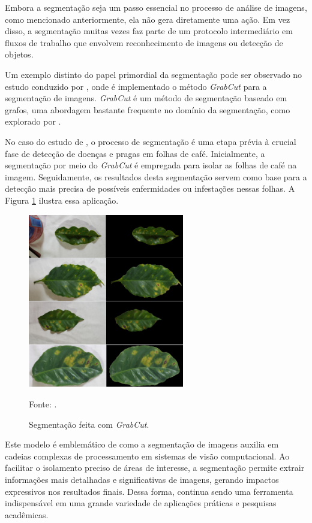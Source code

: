 Embora a segmentação seja um passo essencial no processo de análise de imagens, como mencionado anteriormente, ela não gera diretamente uma ação. Em vez disso, a segmentação muitas vezes faz parte de um protocolo intermediário em fluxos de trabalho que envolvem reconhecimento de imagens ou detecção de objetos.

Um exemplo distinto do papel primordial da segmentação pode ser observado no estudo conduzido por \cite{Carneiro2021}, onde é implementado o método \textit{GrabCut} \citep{rother2004grabcut} para a segmentação de imagens. \textit{GrabCut} é um método de segmentação baseado em grafos, uma abordagem bastante frequente no domínio da segmentação, como explorado por \cite{Yi2012}.

No caso do estudo de \cite{Carneiro2021}, o processo de segmentação é uma etapa prévia à crucial fase de detecção de doenças e pragas em folhas de café. Inicialmente, a segmentação por meio do \textit{GrabCut} é empregada para isolar as folhas de café na imagem. Seguidamente, os resultados desta segmentação servem como base para a detecção mais precisa de possíveis enfermidades ou infestações nessas folhas. A Figura \ref{intro:fig:3} ilustra essa aplicação.

\begin{figure}[H]
    \centering
    \caption{Segmentação feita com \textit{GrabCut}.}
    \includegraphics[height=3in]{recursos/imagens/introduction/grabcut.png}

    \label{intro:fig:3}

    Fonte: \cite{Carneiro2021}.
\end{figure}

Este modelo é emblemático de como a segmentação de imagens auxilia em cadeias complexas de processamento em sistemas de visão computacional. Ao facilitar o isolamento preciso de áreas de interesse, a segmentação permite extrair informações mais detalhadas e significativas de imagens, gerando impactos expressivos nos resultados finais. Dessa forma, continua sendo uma ferramenta indispensável em uma grande variedade de aplicações práticas e pesquisas acadêmicas.


